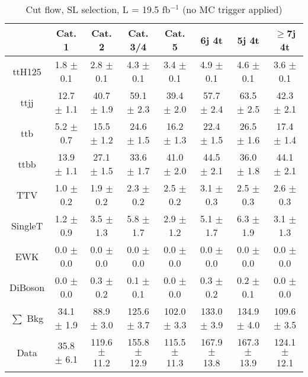 \documentclass{article}
\begin{document}
        \begin{table*}[htbp]
        \begin{center}
\label{tab:cutflow}
\begin{tabular}{| c| c| c| c| c| c| c| c| }
\hline
 & Cat. 1  & Cat. 2  & Cat. 3/4  & Cat. 5  & 6j 4t  & 5j 4t  & $\ge$7j 4t \\ \hline
ttH125 &  1.8 $\pm$ 0.1  &  2.8 $\pm$ 0.1  &  4.3 $\pm$ 0.1  &  3.4 $\pm$ 0.1  &  4.9 $\pm$ 0.1  &  4.6 $\pm$ 0.1  &  3.6 $\pm$ 0.1 \\
ttjj &  12.7 $\pm$ 1.1  &  40.7 $\pm$ 1.9  &  59.1 $\pm$ 2.3  &  39.4 $\pm$ 2.0  &  57.7 $\pm$ 2.4  &  63.5 $\pm$ 2.5  &  42.3 $\pm$ 2.1 \\
ttb &  5.2 $\pm$ 0.7  &  15.5 $\pm$ 1.2  &  24.6 $\pm$ 1.5  &  16.2 $\pm$ 1.3  &  22.4 $\pm$ 1.5  &  26.5 $\pm$ 1.6  &  17.4 $\pm$ 1.4 \\
ttbb &  13.9 $\pm$ 1.1  &  27.1 $\pm$ 1.5  &  33.6 $\pm$ 1.7  &  41.0 $\pm$ 2.0  &  44.5 $\pm$ 2.1  &  36.0 $\pm$ 1.8  &  44.1 $\pm$ 2.1 \\
TTV &  1.0 $\pm$ 0.2  &  1.9 $\pm$ 0.2  &  2.3 $\pm$ 0.2  &  2.5 $\pm$ 0.2  &  3.1 $\pm$ 0.3  &  2.5 $\pm$ 0.3  &  2.6 $\pm$ 0.3 \\
SingleT &  1.2 $\pm$ 0.9  &  3.5 $\pm$ 1.3  &  5.8 $\pm$ 1.7  &  2.9 $\pm$ 1.2  &  5.1 $\pm$ 1.7  &  6.3 $\pm$ 1.9  &  3.1 $\pm$ 1.3 \\
EWK &  0.0 $\pm$ 0.0  &  0.0 $\pm$ 0.0  &  0.0 $\pm$ 0.0  &  0.0 $\pm$ 0.0  &  0.0 $\pm$ 0.0  &  0.0 $\pm$ 0.0  &  0.0 $\pm$ 0.0 \\
DiBoson &  0.0 $\pm$ 0.0  &  0.3 $\pm$ 0.2  &  0.1 $\pm$ 0.1  &  0.0 $\pm$ 0.0  &  0.3 $\pm$ 0.2  &  0.2 $\pm$ 0.1  &  0.0 $\pm$ 0.0 \\
\hline
$\sum$ Bkg &  34.1 $\pm$ 1.9  &  88.9 $\pm$ 3.0  &  125.6 $\pm$ 3.7  &  102.0 $\pm$ 3.3  &  133.0 $\pm$ 3.9  &  134.9 $\pm$ 4.0  &  109.6 $\pm$ 3.5 \\
\hline
Data &  35.8 $\pm$ 6.1  &  119.6 $\pm$ 11.2  &  155.8 $\pm$ 12.9  &  115.5 $\pm$ 11.3  &  167.9 $\pm$ 13.8  &  167.3 $\pm$ 13.9  &  124.1 $\pm$ 12.1 \\
\hline

        \end{tabular}

\caption{Cut flow, SL selection,   L = 19.5 fb$^{-1}$  (no MC trigger applied)  }
   
     \end{center}
        \end{table*}

        
\end{document}
